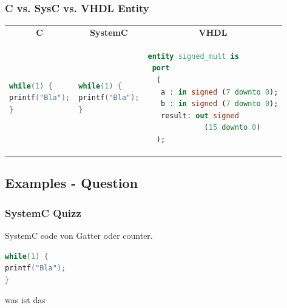\documentclass{beamer}
\begin{document}
\begin{frame}[fragile] \frametitle{C vs. SysC vs. VHDL Entity} 
\begin{tabular}{p{}|p{}|p{}}
\multicolumn{1}{c}{\textbf{C}} & \multicolumn{1}{c}{\textbf{SystemC}} & \multicolumn{1}{c}{\textbf{VHDL}} \\
\begin{lstlisting}[language=C]
while(1) {
printf("Bla");
}
\end{lstlisting}
& 
\begin{lstlisting}[language=C++, ]
while(1) {
printf("Bla");
}
\end{lstlisting}
 &  
\begin{lstlisting}[language=VHDL]
entity signed_mult is
 port
  (
   a : in signed (7 downto 0);
   b : in signed (7 downto 0);
   result: out signed 
   		     (15 downto 0)
  );
\end{lstlisting}
\end{tabular}

\end{frame}

\subsection{Examples - Question}
\begin{frame}[fragile]\frametitle{SystemC Quizz} 
SystemC code von Gatter oder counter.
\begin{lstlisting}[language=C++, basicstyle=\footnotesize]
while(1) {
printf("Bla");
}
\end{lstlisting}
was ist das
\end{frame}
\end{document}

